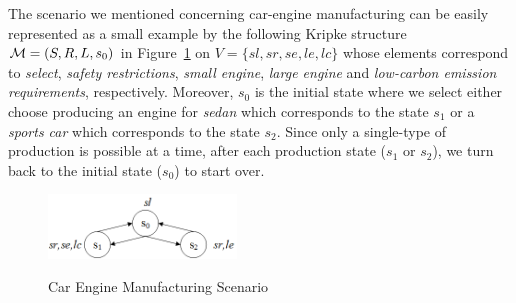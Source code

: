 \documentclass{article}
\begin{document}
The scenario we mentioned concerning car-engine manufacturing can be easily represented  as a small example by the following Kripke structure ${\cal M}=(S, R, L, s_0)$ in Figure~\ref{BVM} on $V=\{ sl, sr, se, le, lc\}$ whose elements correspond to  \emph{select},  \emph{safety restrictions}, \emph{small engine},  \emph{large engine} and \emph{low-carbon emission requirements}, respectively. Moreover, $s_0$ is the initial state where we select either choose producing an engine for \emph{sedan} which corresponds to the state $s_1$ or a \emph{sports car} which corresponds to the state $s_2$.
Since only a single-type of production is possible at a time, after each production state ($s_1$ or $s_2$), we turn back to the initial state ($s_0$) to start over.
\begin{figure}[ht]
  \centering
  \includegraphics[width=5cm]{BVM.png}\\
  \caption{Car Engine Manufacturing Scenario }\label{BVM}
\end{figure}






\end{document}
